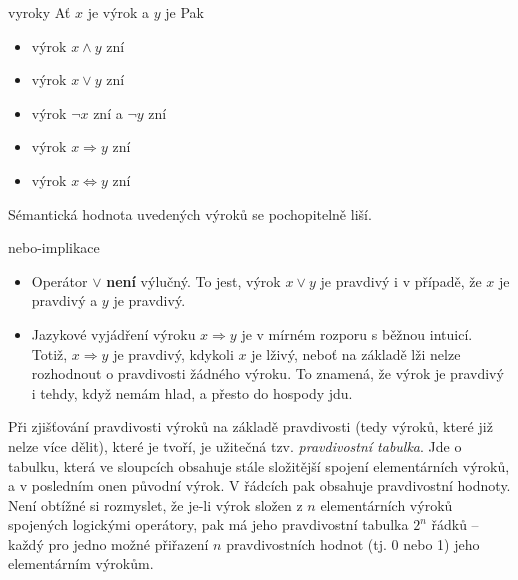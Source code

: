 \begin{example}{}{vyroky}
 Ať $x$ je výrok  a $y$ je  Pak
 \begin{itemize}
  \item výrok $x \wedge y$ zní 
  \item výrok $x \vee y$ zní 
  \item výrok $\neg x$ zní  a $\neg y$ zní 
  \item výrok $x \Rightarrow y$ zní 
  \item výrok $x \Leftrightarrow y$ zní 
 \end{itemize}
 Sémantická hodnota uvedených výroků se pochopitelně liší.
\end{example}
\begin{warning}{}{nebo-implikace}
 \begin{itemize}
  \item Operátor $ \vee $ \textbf{není} výlučný. To jest, výrok $x \vee y$ je
   pravdivý i v případě, že $x$ je pravdivý a $y$ je pravdivý.
  \item Jazykové vyjádření výroku $x \Rightarrow y$ je v mírném rozporu s běžnou
   intuicí. Totiž, $x \Rightarrow y$ je pravdivý, kdykoli $x$ je lživý, neboť na
   základě lži nelze rozhodnout o pravdivosti žádného výroku. To znamená, že
   výrok  je pravdivý i tehdy, když nemám
   hlad, a přesto do hospody jdu.
 \end{itemize}
\end{warning}

Při zjišťování pravdivosti výroků na základě pravdivosti  (tedy výroků, které již nelze více dělit), které je tvoří, je užitečná
tzv. \emph{pravdivostní tabulka}. Jde o tabulku, která ve sloupcích obsahuje
stále složitější spojení elementárních výroků, a v posledním onen původní výrok.
V řádcích pak obsahuje pravdivostní hodnoty. Není obtížné si rozmyslet, že je-li
výrok složen z $n$ elementárních výroků spojených logickými operátory, pak má
jeho pravdivostní tabulka $2^{n}$ řádků -- každý pro jedno možné přiřazení $n$
pravdivostních hodnot (tj. 0 nebo 1) jeho elementárním výrokům.

